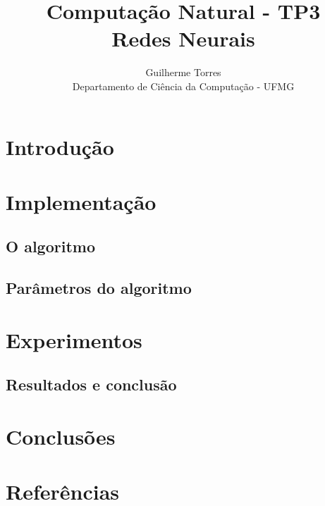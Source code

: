 \documentclass[11pt]{article}
\begin{document}
\title{Computação Natural - TP3\\Redes Neurais}
\author{Guilherme Torres\\Departamento de Ciência da Computação - UFMG}
\date{}
\maketitle

\section{Introdução}

\section{Implementação}

\subsection{O algoritmo}

\subsection{Parâmetros do algoritmo}

\section{Experimentos}

\subsection{Resultados e conclusão}

\section{Conclusões}

\section{Referências}
\end{document}
